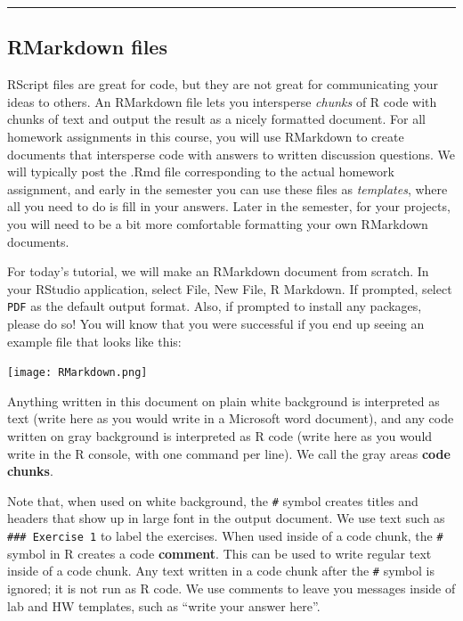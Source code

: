 \documentclass[
]{article}
\begin{document}
\begin{center}\rule{0.5\linewidth}{0.5pt}\end{center}

\subsection{RMarkdown files}\label{rmarkdown-files}

RScript files are great for code, but they are not great for
communicating your ideas to others. An RMarkdown file lets you
intersperse \emph{chunks} of R code with chunks of text and output the
result as a nicely formatted document. For all homework assignments in
this course, you will use RMarkdown to create documents that intersperse
code with answers to written discussion questions. We will typically
post the .Rmd file corresponding to the actual homework assignment, and
early in the semester you can use these files as \emph{templates}, where
all you need to do is fill in your answers. Later in the semester, for
your projects, you will need to be a bit more comfortable formatting
your own RMarkdown documents.

For today's tutorial, we will make an RMarkdown document from scratch.
In your RStudio application, select File, New File, R Markdown. If
prompted, select \texttt{PDF} as the default output format. Also, if
prompted to install any packages, please do so! You will know that you
were successful if you end up seeing an example file that looks like
this:

\texttt{[image: RMarkdown.png]}

Anything written in this document on plain white background is
interpreted as text (write here as you would write in a Microsoft word
document), and any code written on gray background is interpreted as R
code (write here as you would write in the R console, with one command
per line). We call the gray areas \textbf{code chunks}.

Note that, when used on white background, the \texttt{\#} symbol creates
titles and headers that show up in large font in the output document. We
use text such as \texttt{\#\#\#\ Exercise\ 1} to label the exercises.
When used inside of a code chunk, the \texttt{\#} symbol in R creates a
code \textbf{comment}. This can be used to write regular text inside of
a code chunk. Any text written in a code chunk after the \texttt{\#}
symbol is ignored; it is not run as R code. We use comments to leave you
messages inside of lab and HW templates, such as ``write your answer
here''.
\end{document}
